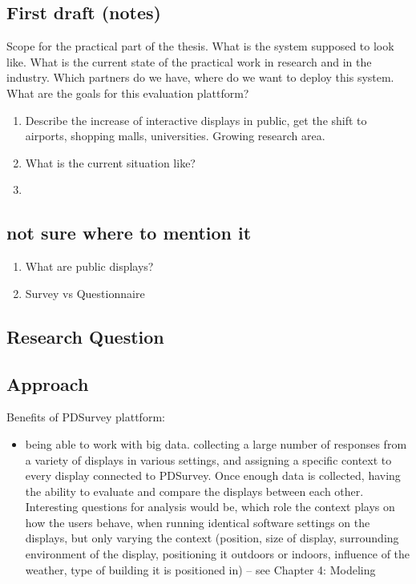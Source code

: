 \subsection{First draft (notes)}

	Scope for the practical part of the thesis. What is the system supposed to look like. What is the current state of the practical work in research and in the industry. Which partners do we have, where do we want to deploy this system. What are the goals for this evaluation plattform?



	\begin{enumerate}
	\item Describe the increase of interactive displays in public, get the shift to airports, shopping malls, universities. Growing research area.
	
	\item What is the current situation like?

	\item 
	\end{enumerate}





\subsection{not sure where to mention it}

	\begin{enumerate}
	\item What are public displays?
	\item Survey vs Questionnaire
	\end{enumerate}


	\subsection{Research Question}



	\subsection{Approach}



	Benefits of PDSurvey plattform:

	\begin{itemize}
	\item being able to work with big data. collecting a large number of responses from a variety of displays in various settings, and assigning a specific context to every display connected to PDSurvey. Once enough data is collected, having the ability to evaluate and compare the displays between each other. Interesting questions for analysis would be, which role the context plays on how the users behave, when running identical software settings on the displays, but only varying the context (position, size of display, surrounding environment of the display, positioning it outdoors or indoors, influence of the weather, type of building it is positioned in) -- see Chapter 4: Modeling
	\end{itemize}


